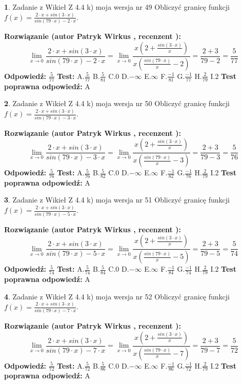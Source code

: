 \documentclass[12pt, a4paper]{article}
\theoremstyle{definition} %
\newtheorem{zad}{}
\newcommand{\zadStart}[1]{\begin{zad}#1\newline}
\newcommand{\zadStop}{\end{zad}}
\newcommand{\rozwStart}[2]{\noindent \textbf{Rozwiązanie (autor #1 , recenzent #2): }\newline}
\newcommand{\rozwStop}{\newline}
\newcommand{\odpStart}{\noindent \textbf{Odpowiedź:}\newline}
\newcommand{\odpStop}{\newline}
\newcommand{\testStart}{\noindent \textbf{Test:}\newline}
\newcommand{\testStop}{\newline}
\newcommand{\kluczStart}{\noindent \textbf{Test poprawna odpowiedź:}\newline}
\newcommand{\kluczStop}{\newline}
\begin{document}
\zadStart{Zadanie z Wikieł Z 4.4 k) moja wersja nr 49}
Obliczyć granicę funkcji $f(x)=\frac{2\cdot x +sin(3\cdot x)}{sin(79\cdot x) -2\cdot x}$.
\zadStop
\rozwStart{Patryk Wirkus}{}
$$\lim\limits_{x\to 0}\frac{2\cdot x +sin(3\cdot x)}{sin(79\cdot x) -2\cdot x}
=\lim\limits_{x\to 0}\frac{x(2+\frac{sin(3\cdot x)}{x})}{x(\frac{sin(79\cdot x)}{x}-2)}
=\frac{2+3}{79-2} = \frac{5}{77}$$
\rozwStop
\odpStart
$\frac{5}{77}$
\odpStop
\testStart
A.$\frac{5}{77}$
B.$\frac{5}{81}$
C.$0$
D.$-\infty$
E.$\infty$
F.$\frac{-1}{81}$
G.$\frac{-1}{77}$
H.$\frac{2}{79}$
I.$2$
\testStop
\kluczStart
A
\kluczStop



\zadStart{Zadanie z Wikieł Z 4.4 k) moja wersja nr 50}
Obliczyć granicę funkcji $f(x)=\frac{2\cdot x +sin(3\cdot x)}{sin(79\cdot x) -3\cdot x}$.
\zadStop
\rozwStart{Patryk Wirkus}{}
$$\lim\limits_{x\to 0}\frac{2\cdot x +sin(3\cdot x)}{sin(79\cdot x) -3\cdot x}
=\lim\limits_{x\to 0}\frac{x(2+\frac{sin(3\cdot x)}{x})}{x(\frac{sin(79\cdot x)}{x}-3)}
=\frac{2+3}{79-3} = \frac{5}{76}$$
\rozwStop
\odpStart
$\frac{5}{76}$
\odpStop
\testStart
A.$\frac{5}{76}$
B.$\frac{5}{82}$
C.$0$
D.$-\infty$
E.$\infty$
F.$\frac{-1}{82}$
G.$\frac{-1}{76}$
H.$\frac{2}{79}$
I.$2$
\testStop
\kluczStart
A
\kluczStop



\zadStart{Zadanie z Wikieł Z 4.4 k) moja wersja nr 51}
Obliczyć granicę funkcji $f(x)=\frac{2\cdot x +sin(3\cdot x)}{sin(79\cdot x) -5\cdot x}$.
\zadStop
\rozwStart{Patryk Wirkus}{}
$$\lim\limits_{x\to 0}\frac{2\cdot x +sin(3\cdot x)}{sin(79\cdot x) -5\cdot x}
=\lim\limits_{x\to 0}\frac{x(2+\frac{sin(3\cdot x)}{x})}{x(\frac{sin(79\cdot x)}{x}-5)}
=\frac{2+3}{79-5} = \frac{5}{74}$$
\rozwStop
\odpStart
$\frac{5}{74}$
\odpStop
\testStart
A.$\frac{5}{74}$
B.$\frac{5}{84}$
C.$0$
D.$-\infty$
E.$\infty$
F.$\frac{-1}{84}$
G.$\frac{-1}{74}$
H.$\frac{2}{79}$
I.$2$
\testStop
\kluczStart
A
\kluczStop



\zadStart{Zadanie z Wikieł Z 4.4 k) moja wersja nr 52}
Obliczyć granicę funkcji $f(x)=\frac{2\cdot x +sin(3\cdot x)}{sin(79\cdot x) -7\cdot x}$.
\zadStop
\rozwStart{Patryk Wirkus}{}
$$\lim\limits_{x\to 0}\frac{2\cdot x +sin(3\cdot x)}{sin(79\cdot x) -7\cdot x}
=\lim\limits_{x\to 0}\frac{x(2+\frac{sin(3\cdot x)}{x})}{x(\frac{sin(79\cdot x)}{x}-7)}
=\frac{2+3}{79-7} = \frac{5}{72}$$
\rozwStop
\odpStart
$\frac{5}{72}$
\odpStop
\testStart
A.$\frac{5}{72}$
B.$\frac{5}{86}$
C.$0$
D.$-\infty$
E.$\infty$
F.$\frac{-1}{86}$
G.$\frac{-1}{72}$
H.$\frac{2}{79}$
I.$2$
\testStop
\kluczStart
A
\kluczStop
\end{document}
